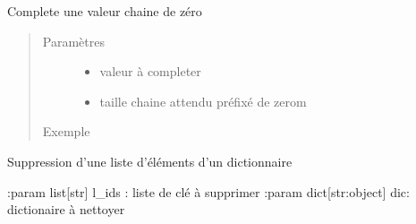 \documentclass[letterpaper,10pt,french]{sphinxmanual}
\begin{document}
\begin{fulllineitems}
\label{\detokenize{modules/tools:toolbox.tools.plain_zero}}
Complete une valeur chaine de zéro
\begin{quote}\begin{description}
\item[{Paramètres}] \leavevmode\begin{itemize}
\item {} 
 \textendash{} valeur à completer

\item {} 
 \textendash{} taille chaine attendu préfixé de zerom

\end{itemize}

\item[{Exemple}] \leavevmode
\begin{sphinxVerbatim}[commandchars=\\\{\}]
  
\end{sphinxVerbatim}

\end{description}\end{quote}

\end{fulllineitems}


\begin{fulllineitems}
\label{\detokenize{modules/tools:toolbox.tools.pop_dic}}
Suppression d’une liste d’éléments d’un dictionnaire

:param list{[}str{]} l\_ids : liste de clé à supprimer
:param dict{[}str:object{]} dic: dictionaire à nettoyer

\end{fulllineitems}

\end{document}
